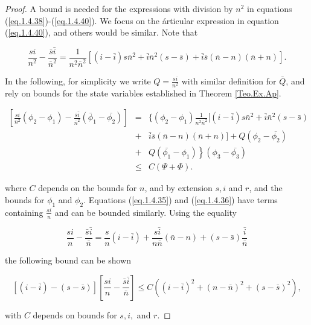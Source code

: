 \begin{proof}
A bound is needed for the expressions with division by $n^2$ in equations (\ref{eq.1.4.38})-(\ref{eq.1.4.40}). We focus on the árticular expression in equation (\ref{eq.1.4.40}), and others would be similar. Note that

\begin{equation*}
\frac{si}{n^2}-\frac{\bar{s}\bar{i}}{\bar{n}^2}=\frac{1}{n^2\bar{n}^2}[(i-\bar{i})s\bar{n}^2+\bar{i}\bar{n}^2(s-\bar{s})+\bar{i}\bar{s}(\bar{n}-n)(\bar{n}+n)].
\end{equation*}

In the following, for simplicity we write $Q=\frac{si}{n^2}$ with similar definition for $\bar{Q}$, and rely on bounds for the state variables established in Theorem \ref{Teo.Ex.Ap}.

\begin{eqnarray}
\left[\frac{si}{n^2}(\phi_2-\phi_1)-\frac{\bar{s}\bar{i}}{\bar{n}^2}(\bar{\phi}_1-\bar{\phi_2})\right]&=&\{(\phi_2-\phi_1)\frac{1}{n^2\bar{n}^2}[(i-\bar{i})s\bar{n}^2+\bar{i}\bar{n}^2(s-\bar{s})\nonumber\\
&+&\bar{i}\bar{s}(\bar{n}-n)(\bar{n}+n)]+Q(\phi_2-\bar{\phi_2})\nonumber\\
&+&\left. Q(\bar{\phi_1}-\phi_1)\right\}(\phi_3-\bar{\phi_3})\nonumber \\
&\leq& C(\Psi+\Phi). \label{eq.1.4.44}
\end{eqnarray}

where $C$ depends on the bounds for $n$, and by extension $s,i$ and $r$, and the bounds for $\phi_1$ and $\phi_2$. Equations (\ref{eq.1.4.35}) and (\ref{eq.1.4.36}) have terms containing $\frac{si}{n}$ and can be bounded similarly. Using the equality

\begin{equation*}
\frac{si}{n}-\frac{\bar{s}\bar{i}}{\bar{n}}=\frac{s}{n}(i-\bar{i})+\frac{s\bar{i}}{n\bar{n}}(\bar{n}-n)+(s-\bar{s})\frac{\bar{i}}{\bar{n}}
\end{equation*}

the following bound can be shown

\begin{equation}\label{eq.1.4.45}
[(i-\bar{i})-(s-\bar{s})]\left[\frac{si}{n}-\frac{\bar{s}\bar{i}}{\bar{n}}\right]\leq C((i-\bar{i})^2+(n-\bar{n})^2+(s-\bar{s})^2),
\end{equation}

with $C$ depends on bounds for $s,i,$ and $r$.
\end{proof}

